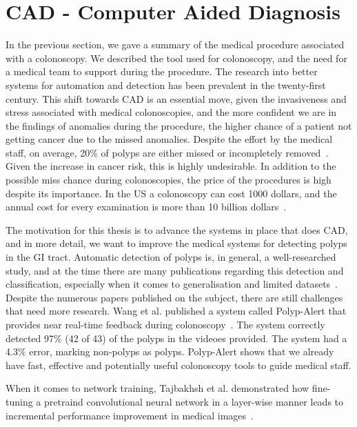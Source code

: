 \section{CAD - Computer Aided Diagnosis}
\label{cha:CAD}
In the previous section, we gave a summary of the medical procedure associated with a colonoscopy. We described the tool used for colonoscopy,  and the need for a medical team to support during the procedure.
The research into better systems for automation and detection has been prevalent in the twenty-first century.  This shift towards CAD is an essential move, given the invasiveness and stress associated with medical colonoscopies, and the more confident we are in the findings of anomalies during the procedure, the higher chance of a patient not getting cancer due to the missed anomalies.
Despite the effort by the medical staff, on average, 20\% of polyps are either missed or incompletely removed~\cite{kaminski2010quality}. Given the increase in cancer risk, this is highly undesirable.
In addition to the possible miss chance during colonoscopies, the price of the procedures is high despite its importance. In the US a colonoscopy can cost 1000 dollars, and the annual cost for every examination is more than 10 billion dollars~\cite{NYT_cancer, NYT_cancer2}.

The motivation for this thesis is to advance the systems in place that does CAD, and in more detail, we want to improve the medical systems for detecting polyps in the GI tract. 
Automatic detection of polyps is, in general, a well-researched study, and at the time there are many publications regarding this detection and classification, especially when it comes to generalisation and limited datasets~\cite{riegler2016multimedia}.  
Despite the numerous papers published on the subject, there are still challenges that need more research. 
\vspace{5px}
Wang et al. published a system called Polyp-Alert that provides near real-time feedback during colonoscopy~\cite{wang2015polyp}. The system correctly detected 97\% (42 of 43) of the polyps in the videoes provided. The system had a 4.3\% error, marking non-polyps as polyps. Polyp-Alert shows that we already have fast, effective and potentially useful colonoscopy tools to guide medical staff.

When it comes to network training,  Tajbakhsh et al. demonstrated how fine-tuning a pretraind convolutional neural network in a layer-wise manner leads to incremental performance improvement in medical images~\cite{DBLP:journals/corr/TajbakhshSGHKGL17}.

